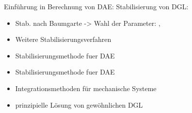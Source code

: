 Einf\"uhrung in Berechnung von DAE: \cite{Fuehrer1990}
Stabilisierung von DGL: \begin{itemize}
\item \cite{Baumgarte1972} Stab. nach Baumgarte -> Wahl der Parameter: \cite{Flores}, \cite{Flores2011}
\item \cite{Cline2003} Weitere Stabilisierungsverfahren
\item \cite{Neto2003} Stabilisierungsmethode fuer DAE
\item \cite{Park1988} Stabilisierungsmethode fuer DAE
\item \cite{Haug1991} Integrationsmethoden f\"ur mechanische Systeme
\item \cite{ErnstHairer2010} prinzipielle L\"osung von gew\"ohnlichen DGL 
\end{itemize}

